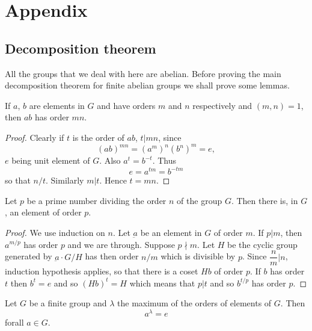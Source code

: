\backmatter

\chapter{Appendix}

\centerline{\fontsize{12}{14}}

\setcounter{section}{0}
\section{Decomposition theorem}\pageoriginale %

All the groups that we deal with here are abelian. Before proving the
main decomposition theorem for finite abelian groups we shall prove
some lemmas.  

\setcounter{lem}{0}
\begin{lem}\label{app:lem1}%
If $a$, $b$ are elements in $G$ and have orders $m$ and $n$
   respectively and $(m, n) = 1$, then $ab$ has order $mn$. 
\end{lem}

\begin{proof}
Clearly if $t$ is the order of $ab$, $t | mn$, since   
$$
(ab)^{mn} = (a^m)^n (b^n)^m = e, 
$$
$e$ being unit element of $G$. Also $a^t = b^{-t}$. Thus 
$$
e = a^{tm} = b^{-tm}
$$
so that $n /t$. Similarly $m | t$. Hence $t = mn$.
\end{proof}

\begin{lem}\label{app:lem2}%
Let $p$ be a prime number dividing the order $n$ of the group
$G$. Then there is, in $G$, an element of order $p$. 
\end{lem}

\begin{proof}
We use induction on $n$. Let $\underbar{a}$ be an element in $G$ of
order $m$. If $p | m$, then $a^{m/p}$ has order $p$ and we are
through. Suppose $p \nmid m$. Let $H$ be the cyclic group generated by
$\underbar{a} \cdot  G/H$ has then order $n/m$ which is divisible by
$p$. Since $\dfrac{n}{m} | n$, induction hypothesis applies, so that
there is a coset $Hb$ of order $p$. If $b$ has order $t$ then $b^t =
e$ and so $(Hb)^t = H$ which means that $p | t$ and so $b^{t/p}$ has
order $p$.  
\end{proof}

\begin{lem}\label{app:lem3}%
  Let $G$ be a finite group and $\lambda$ the maximum of the orders
  of elements of $G$. Then
$$
a^\lambda = e
$$
for\pageoriginale all $a \in G$.
\end{lem}  

